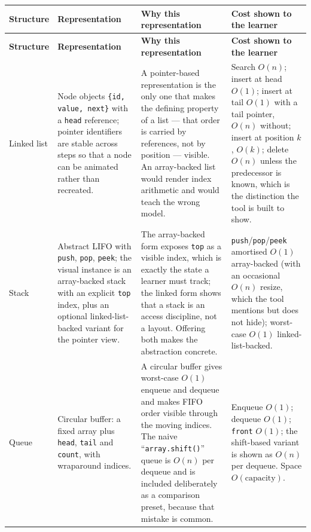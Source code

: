 \documentclass[11pt,a4paper]{article}
\newcommand{\ct}[1]{\texttt{#1}}
\begin{document}
{\footnotesize
\setlength{\tabcolsep}{3pt}
\begin{longtable}{@{}L{1.9cm}L{4.6cm}L{4.3cm}L{4.2cm}@{}}
\toprule
\textbf{Structure} & \textbf{Representation} & \textbf{Why this representation} &
\textbf{Cost shown to the learner} \\
\midrule
\endfirsthead
\toprule
\textbf{Structure} & \textbf{Representation} & \textbf{Why this representation} &
\textbf{Cost shown to the learner} \\
\midrule
\endhead
\bottomrule
\endlastfoot

Linked list & Node objects \ct{\{id, value, next\}} with a \ct{head} reference; pointer
identifiers are stable across steps so that a node can be animated rather than recreated. &
A pointer-based representation is the only one that makes the defining property of a list
--- that order is carried by references, not by position --- visible. An array-backed list
would render index arithmetic and would teach the wrong model. &
Search $O(n)$; insert at head $O(1)$; insert at tail $O(1)$ with a tail pointer, $O(n)$
without; insert at position $k$, $O(k)$; delete $O(n)$ unless the predecessor is known,
which is the distinction the tool is built to show. \\

Stack & Abstract LIFO with \ct{push}, \ct{pop}, \ct{peek}; the visual instance is an
array-backed stack with an explicit \ct{top} index, plus an optional linked-list-backed
variant for the pointer view. &
The array-backed form exposes \ct{top} as a visible index, which is exactly the state a
learner must track; the linked form shows that a stack is an access discipline, not a
layout. Offering both makes the abstraction concrete. &
\ct{push}/\ct{pop}/\ct{peek} amortised $O(1)$ array-backed (with an occasional $O(n)$
resize, which the tool mentions but does not hide); worst-case $O(1)$
linked-list-backed. \\

Queue & Circular buffer: a fixed array plus \ct{head}, \ct{tail} and \ct{count}, with
wraparound indices. &
A circular buffer gives worst-case $O(1)$ enqueue and dequeue and makes FIFO order visible
through the moving indices. The naive ``\ct{array.shift()}'' queue is $O(n)$ per dequeue
and is included deliberately as a comparison preset, because that mistake is common. &
Enqueue $O(1)$; dequeue $O(1)$; \ct{front} $O(1)$; the shift-based variant is shown as
$O(n)$ per dequeue. Space $O(\text{capacity})$. \\


\end{longtable}}
\end{document}

